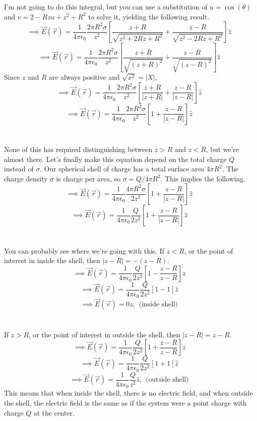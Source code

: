 \documentclass[12pt]{article}
\begin{document}
\begin{flushleft}
I'm not going to do this integral, but you can use a substitution of $u=\cos(\theta)$ and $v=2-Rzu+z^2+R^2$ to solve it, yielding the following result.
$$\implies\vec{E}(\vec{r})=\frac{1}{4\pi\epsilon_0}\frac{2\pi R^2\sigma}{z^2}\left[\frac{z+R}{\sqrt{z^2+2Rz+R^2}}+\frac{z-R}{\sqrt{z^2-2Rz+R^2}}\right]\hat{z}$$
$$\implies\vec{E}(\vec{r})=\frac{1}{4\pi\epsilon_0}\frac{2\pi R^2\sigma}{z^2}\left[\frac{z+R}{\sqrt{(z+R)^2}}+\frac{z-R}{\sqrt{(z-R)^2}}\right]\hat{z}$$
Since $z$ and $R$ are always positive and $\sqrt{x^2}=|X|$,
$$\implies\vec{E}(\vec{r})=\frac{1}{4\pi\epsilon_0}\frac{2\pi R^2\sigma}{z^2}\left[\frac{z+R}{|z+R|}+\frac{z-R}{|z-R|}\right]\hat{z}$$
$$\implies\vec{E}(\vec{r})=\frac{1}{4\pi\epsilon_0}\frac{2\pi R^2\sigma}{z^2}\left[1+\frac{z-R}{|z-R|}\right]\hat{z}$$\\~\\

None of this has required distinguishing between $z>R$ and $z<R$, but we're almost there.
Let's finally make this equation depend on the total charge $Q$ instead of $\sigma$.
Our spherical shell of charge has a total surface area $4\pi R^2$.
The charge density $\sigma$ is charge per area, so $\sigma=Q/4\pi R^2$.
This implies the following.
$$\implies\vec{E}(\vec{r})=\frac{1}{4\pi\epsilon_0}\frac{4\pi R^2\sigma}{2z^2}\left[1+\frac{z-R}{|z-R|}\right]\hat{z}$$
$$\implies\vec{E}(\vec{r})=\frac{1}{4\pi\epsilon_0}\frac{Q}{2z^2}\left[1+\frac{z-R}{|z-R|}\right]\hat{z}$$\\~\\

You can probably see where we're going with this.
If $z<R$, or the point of interest in inside the shell, then $|z-R|=-(z-R)$.
$$\implies\vec{E}(\vec{r})=\frac{1}{4\pi\epsilon_0}\frac{Q}{2z^2}\left[1-\frac{z-R}{z-R}\right]\hat{z}$$
$$\implies\vec{E}(\vec{r})=\frac{1}{4\pi\epsilon_0}\frac{Q}{2z^2}\left[1-1\right]\hat{z}$$
$$\implies\vec{E}(\vec{r})=0\hat{z},\ \ \text{(inside shell)}$$\\~\\

If $z>R$, or the point of interest in outside the shell, then $|z-R|=z-R$.
$$\implies\vec{E}(\vec{r})=\frac{1}{4\pi\epsilon_0}\frac{Q}{2z^2}\left[1+\frac{z-R}{z-R}\right]\hat{z}$$
$$\implies\vec{E}(\vec{r})=\frac{1}{4\pi\epsilon_0}\frac{Q}{2z^2}\left[1+1\right]\hat{z}$$
$$\implies\vec{E}(\vec{r})=\frac{1}{4\pi\epsilon_0}\frac{Q}{z^2}\hat{z},\ \ \text{(outside shell)}$$
This means that when inside the shell, there is no electric field, and when outside the shell, the electric field is the same as if the system were a point charge with charge $Q$ at the center.



\end{flushleft}
\end{document}
